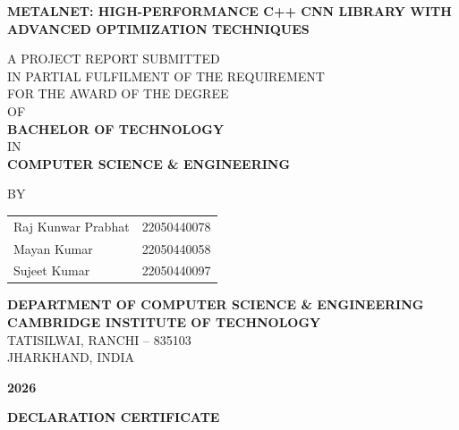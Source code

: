 \documentclass[12pt,oneside,a4paper]{report}
\begin{document}
\thispagestyle{empty}
\begin{center}
    \vspace*{1cm}
    \textbf{\Large METALNET: HIGH-PERFORMANCE C++ CNN LIBRARY WITH\\
    ADVANCED OPTIMIZATION TECHNIQUES}

    \vspace{2cm}
    \normalsize A PROJECT REPORT SUBMITTED\\
    IN PARTIAL FULFILMENT OF THE REQUIREMENT\\
    FOR THE AWARD OF THE DEGREE\\
    OF\\
    \textbf{BACHELOR OF TECHNOLOGY}\\
    IN\\
    \textbf{COMPUTER SCIENCE \& ENGINEERING}

    \vspace{2cm}
    BY

    \vspace{1.5cm}
    \begin{tabular}{@{}lr@{}}
    Raj Kunwar Prabhat & 22050440078 \\
    Mayan Kumar & 22050440058 \\
    Sujeet Kumar & 22050440097 \\
    \end{tabular}

    \vspace{2cm}
    \textbf{DEPARTMENT OF COMPUTER SCIENCE \& ENGINEERING}\\
    \textbf{CAMBRIDGE INSTITUTE OF TECHNOLOGY}\\
    TATISILWAI, RANCHI -- 835103\\
    JHARKHAND, INDIA

    \vspace{1.5cm}
    \textbf{2026}
\end{center}

\newpage

\thispagestyle{empty}
\vspace*{2cm}
\begin{center}
    \textbf{\Large DECLARATION CERTIFICATE}
\end{center}

\vspace{2cm}
\end{document}
